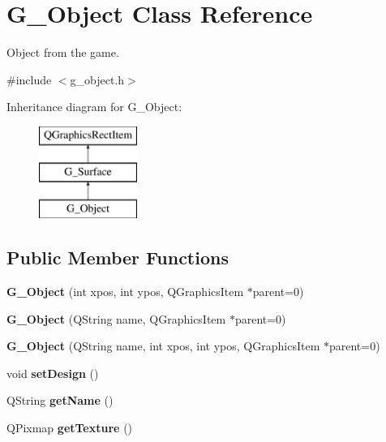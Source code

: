 \hypertarget{class_g___object}{}\section{G\+\_\+\+Object Class Reference}
\label{class_g___object}


Object from the game.  




{\ttfamily \#include $<$g\+\_\+object.\+h$>$}

Inheritance diagram for G\+\_\+\+Object\+:\begin{figure}[H]
\begin{center}
\leavevmode
\includegraphics[height=3.000000cm]{class_g___object}
\end{center}
\end{figure}
\subsection*{Public Member Functions}
\begin{DoxyCompactItemize}
\item 
\hypertarget{class_g___object_aa64de9d24e8b67e33e537657030a813d}{}{\bfseries G\+\_\+\+Object} (int xpos, int ypos, Q\+Graphics\+Item $\ast$parent=0)\label{class_g___object_aa64de9d24e8b67e33e537657030a813d}

\item 
\hypertarget{class_g___object_a9cff8a6000e33f13856af0c3eed47cc6}{}{\bfseries G\+\_\+\+Object} (Q\+String name, Q\+Graphics\+Item $\ast$parent=0)\label{class_g___object_a9cff8a6000e33f13856af0c3eed47cc6}

\item 
\hypertarget{class_g___object_a8bb5382b74b1012eccc2b0005895b9a6}{}{\bfseries G\+\_\+\+Object} (Q\+String name, int xpos, int ypos, Q\+Graphics\+Item $\ast$parent=0)\label{class_g___object_a8bb5382b74b1012eccc2b0005895b9a6}

\item 
\hypertarget{class_g___object_ad9241749fb08c9e3974c3759f98caa80}{}void {\bfseries set\+Design} ()\label{class_g___object_ad9241749fb08c9e3974c3759f98caa80}

\item 
\hypertarget{class_g___object_a945031891a56f388325b8d2920f47737}{}Q\+String {\bfseries get\+Name} ()\label{class_g___object_a945031891a56f388325b8d2920f47737}

\item 
\hypertarget{class_g___object_a0996523a11fefccaff0cc05ad15121bd}{}Q\+Pixmap {\bfseries get\+Texture} ()\label{class_g___object_a0996523a11fefccaff0cc05ad15121bd}

\end{DoxyCompactItemize}

